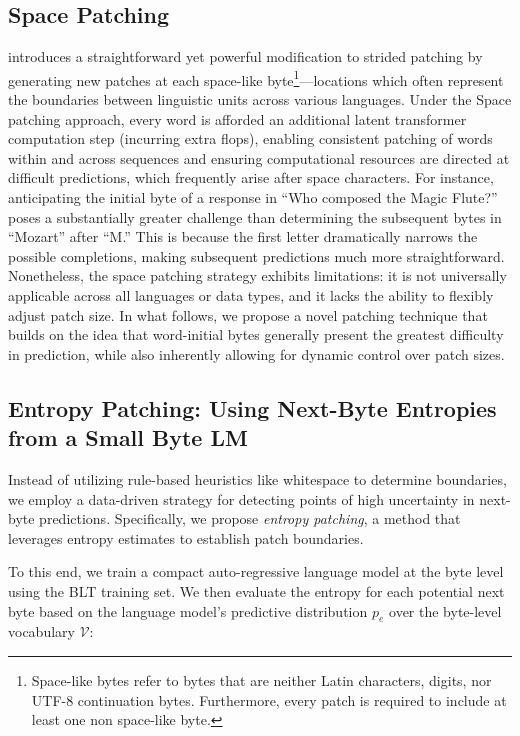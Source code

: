 \subsection{Space Patching}
\label{section:white-patch}

\citet{slagle2024spacebyte} introduces a straightforward yet powerful modification to strided patching by generating new patches at each space-like byte\footnote{
    Space-like bytes refer to bytes that are neither Latin characters, digits, nor UTF-8 continuation bytes. Furthermore, every patch is required to include at least one non space-like byte.
}—locations which often represent the boundaries between linguistic units across various languages. Under the Space patching approach, every word is afforded an additional latent transformer computation step (incurring extra flops), enabling consistent patching of words within and across sequences and ensuring computational resources are directed at difficult predictions, which frequently arise after space characters. For instance, anticipating the initial byte of a response in ``Who composed the Magic Flute?\uline{\hspace{.6em}}'' poses a substantially greater challenge than determining the subsequent bytes in ``Mozart'' after ``M.'' This is because the first letter dramatically narrows the possible completions, making subsequent predictions much more straightforward. Nonetheless, the space patching strategy exhibits limitations: it is not universally applicable across all languages or data types, and it lacks the ability to flexibly adjust patch size. In what follows, we propose a novel patching technique that builds on the idea that word-initial bytes generally present the greatest difficulty in prediction, while also inherently allowing for dynamic control over patch sizes.

\subsection{Entropy Patching: Using Next-Byte Entropies from a Small Byte LM}
\label{section:dyn-patch}

Instead of utilizing rule-based heuristics like whitespace to determine boundaries, we employ a data-driven strategy for detecting points of high uncertainty in next-byte predictions. Specifically, we propose \textit{entropy patching}, a method that leverages entropy estimates to establish patch boundaries.

To this end, we train a compact auto-regressive language model at the byte level using the {\textsc BLT} training set. We then evaluate the entropy for each potential next byte based on the language model's predictive distribution $p_{e}$ over the byte-level vocabulary $\mathcal{V}$:

